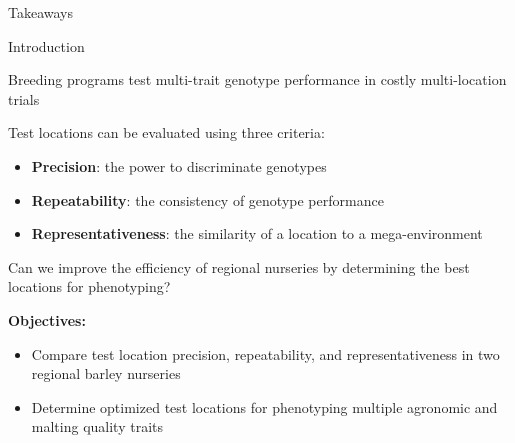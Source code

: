 \documentclass[final]{beamer}
\newlength{\onecolwid}
\begin{document}
\begin{frame}[t]
\begin{columns}[t]
\begin{column}{\onecolwid}
\begin{alertblock}{\Large{Takeaways}}
\end{alertblock}


\begin{block}{Introduction}

Breeding programs test multi-trait genotype performance in costly multi-location trials

\vspace{0.5cm}

Test locations can be evaluated using three criteria\cite{Yan2011}:
\begin{itemize}
  \item \textbf{Precision}: the power to discriminate genotypes
  \item \textbf{Repeatability}: the consistency of genotype performance
  \item \textbf{Representativeness}: the similarity of a location to a mega-environment
\end{itemize}

\vspace{0.5cm}

Can we improve the efficiency of regional nurseries by determining the best locations for phenotyping?

\vspace{0.5cm}

\textbf{Objectives:}
\begin{itemize}
  \item Compare test location precision, repeatability, and representativeness in two regional barley nurseries
  \item Determine optimized test locations for phenotyping multiple agronomic and malting quality traits
\end{itemize}


\end{block}




\end{column}
\end{columns}
\end{frame}
\end{document}
